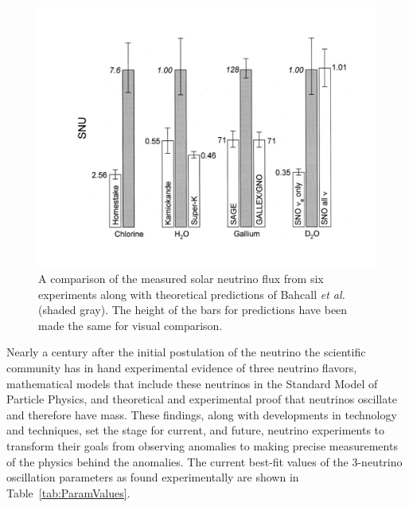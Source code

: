\begin{figure}[t!]
	\centering
	\includegraphics[width=0.6\linewidth]{tex/2-neutrinos-images/ExpSolarFlux}
	\caption[]{A comparison of the measured solar neutrino flux from six experiments along with theoretical predictions of Bahcall \textit{et al.} \cite{Bahcall:2000nu} (shaded gray). The height of the bars for predictions have been made the same for visual comparison. \cite{RevModPhys.75.985}}
	\label{fig:expsolarflux}
\end{figure}


Nearly a century after the initial postulation of the neutrino the scientific community has in hand experimental evidence of three neutrino flavors, mathematical models that include these neutrinos in the Standard Model of Particle Physics, and theoretical and experimental proof that neutrinos oscillate and therefore have mass.
These findings, along with developments in technology and techniques, set the stage for current, and future, neutrino experiments to transform their goals from observing anomalies to making precise measurements of the physics behind the anomalies.
The current best-fit values of the 3-neutrino oscillation parameters as found experimentally are shown in Table~\ref{tab:ParamValues}.


